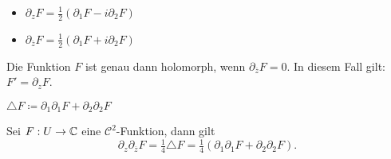 \documentclass{cheat-sheet}
\begin{document}
\begin{nota}[Wirtinger]
  \begin{minipage}[t]{0.5 \linewidth}
    \begin{itemize}
      \item $\partial_{z} F = \tfrac{1}{2} (\partial_1 F - i \partial_2 F)$
      \item $\partial_{\overline{z}} F = \tfrac{1}{2} (\partial_1 F + i \partial_2 F)$
    \end{itemize}
  \end{minipage}
\end{nota}

\begin{lem}
  Die Funktion $F$ ist genau dann holomorph, wenn $\partial_{\overline{z}} F = 0$. In diesem Fall gilt: $F' = \partial_z F$.
\end{lem}

\begin{nota}
  $\triangle F \coloneqq \partial_1 \partial_1 F + \partial_2 \partial_2 F$
\end{nota}

\begin{lem}
  Sei $F : U \to \mathbb{C}$ eine $\mathcal{C}^2$-Funktion, dann gilt
  \[ \partial_z \partial_{\overline{z}} F = \tfrac{1}{4} \triangle F = \tfrac{1}{4} (\partial_1 \partial_1 F + \partial_2 \partial_2 F). \]
\end{lem}




\end{document}
